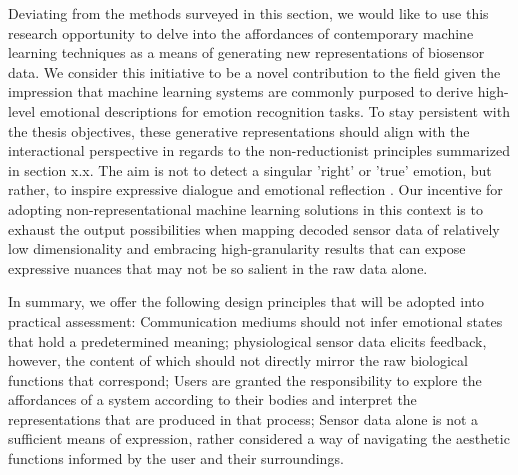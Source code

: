 Deviating from the methods surveyed in this section, we would like to use this research opportunity to delve into the affordances of contemporary machine learning techniques as a means of generating new representations of biosensor data. We consider this initiative to be a novel contribution to the field given the impression that machine learning systems are commonly purposed to derive high-level emotional descriptions for emotion recognition tasks. To stay persistent with the thesis objectives, these generative representations should align with the interactional perspective in regards to the non-reductionist principles summarized in section x.x. The aim is not to detect a singular 'right' or 'true' emotion, but rather, to inspire expressive dialogue and emotional reflection \cite{hook_affective_2009}. Our incentive for adopting non-representational machine learning solutions in this context is to exhaust the output possibilities when mapping decoded sensor data of relatively low dimensionality and embracing high-granularity results that can expose expressive nuances that may not be so salient in the raw data alone.



In summary, we offer the following design principles that will be adopted into practical assessment: Communication mediums should not infer emotional states that hold a predetermined meaning; physiological sensor data elicits feedback, however, the content of which should not directly mirror the raw biological functions that correspond; Users are granted the responsibility to explore the affordances of a system according to their bodies and interpret the representations that are produced in that process; Sensor data alone is not a sufficient means of expression, rather considered a way of navigating the aesthetic functions informed by the user and their surroundings.


